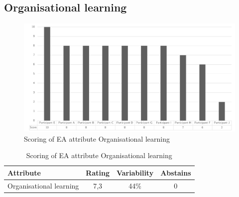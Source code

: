\subsection{Organisational learning}
\begin{figure}[h!]
	\centering
	\includegraphics[width=0.9\linewidth]{images/scoreeaorganisationallearning}
	\caption[Scoring of EA attribute Organisational learning]{Scoring of EA attribute Organisational learning}
	\label{fig:appscoringeaorganiationallearning}
\end{figure}
\begin{table}[h!]
	\centering
	\begin{tabular}{p{}ccc}
		\toprule
		\textbf{Attribute} & \textbf{Rating} & \textbf{Variability} & \textbf{Abstains} \\
		\midrule
		Organisational learning & 7,3 & 44\% & 0 \\%
		\bottomrule
	\end{tabular}%
	\caption[Scoring of EA attribute Organisational learning]{Scoring of EA attribute Organisational learning}
	\label{tab:appscoringeaorganisationallearning}%
\end{table}%
\newpage
